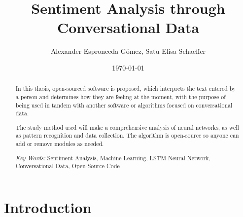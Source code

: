 \documentclass[review]{elsarticle} %
\begin{document}
\author{Alexander {Espronceda Gómez}, Satu {Elisa Schaeffer}}

\date{\today}


\let\today\relax
\makeatletter
\def\ps@pprintTitle{%
    \let\@oddhead\@empty
    \let\@evenhead\@empty
    \def\@oddfoot{\footnotesize\itshape
         {} \hfill\today}%
    \let\@evenfoot\@oddfoot
    }
\makeatother



\title{Sentiment Analysis through Conversational Data}
\address{San Nicolás de los Garza, Nuevo León, México}

\begin{abstract}
In this thesis, open-sourced software is proposed, which interprets the text entered by a person and determines how they are feeling at the moment, with the purpose of being used in tandem with another software or algorithms focused on conversational data.

The study method used will make a comprehensive analysis of neural networks, as well as pattern recognition and data collection.
The algorithm is open-source so anyone can add or remove modules as needed.

\vspace*{0.5cm}
\textit{Key Words: } Sentiment Analysis, Machine Learning, LSTM Neural Network, Conversational Data, Open-Source Code


\end{abstract}

\maketitle

\section{Introduction}
\end{document}
